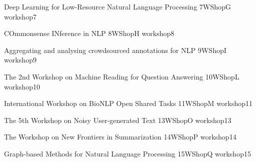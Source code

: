 \begin{wsschedule}
 {Deep Learning for Low-Resource Natural Language Processing}
 {7}{WShopG}
 {workshop7}
 {\WShopLocG}
 
\end{wsschedule}

\begin{wsschedule}
 {COmmonsense INference in NLP}
 {8}{WShopH}
 {workshop8}
 {\WShopLocH}
 
\end{wsschedule}

\begin{wsschedule}
 {Aggregating and analysing crowdsourced annotations for NLP}
 {9}{WShopI}
 {workshop9}
 {\WShopLocI}
 
\end{wsschedule}



\begin{wsschedule}
 {The 2nd Workshop on Machine Reading for Question Answering}
 {10}{WShopL}
 {workshop10}
 {\WShopLocL}
 
\end{wsschedule}
 
\begin{wsschedule}
 {International Workshop on BioNLP Open Shared Tasks}
 {11}{WShopM}
 {workshop11}
 {\WShopLocM}
 
\end{wsschedule}


\begin{wsschedule}
 {The 5th Workshop on Noisy User-generated Text}
 {13}{WShopO}
 {workshop13}
 {\WShopLocO}
 
\end{wsschedule}

\begin{wsschedule}
 {The Workshop on New Frontiers in Summarization}
 {14}{WShopP}
 {workshop14}
 {\WShopLocP}
 
\end{wsschedule}

\begin{wsschedule}
 {Graph-based Methods for Natural Language Processing}
 {15}{WShopQ}
 {workshop15}
 {\WShopLocQ}
 
\end{wsschedule}


